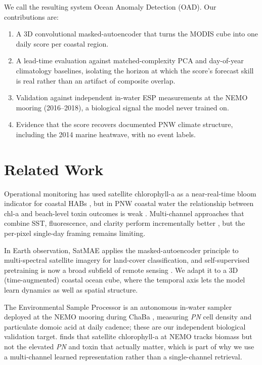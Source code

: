\documentclass[10pt,twocolumn,letterpaper]{article}
\begin{document}
We call the resulting system Ocean Anomaly Detection (OAD). Our contributions are:

\begin{enumerate}\itemsep1pt
    \item A 3D convolutional masked-autoencoder that turns the MODIS cube into one daily score per coastal region.
    \item A lead-time evaluation against matched-complexity PCA and day-of-year climatology baselines, isolating the horizon at which the score's forecast skill is real rather than an artifact of composite overlap.
    \item Validation against independent in-water ESP measurements at the NEMO mooring (2016--2018), a biological signal the model never trained on.
    \item Evidence that the score recovers documented PNW climate structure, including the 2014 marine heatwave, with no event labels.
\end{enumerate}

\section{Related Work}
\label{sec:related}

Operational monitoring has used satellite chlorophyll-a as a near-real-time bloom indicator for coastal HABs \cite{McKibben2015}, but in PNW coastal water the relationship between chl-a and beach-level toxin outcomes is weak \cite{Trainer2000,Trainer2009}. Multi-channel approaches that combine SST, fluorescence, and clarity perform incrementally better \cite{Anderson2016}, but the per-pixel single-day framing remains limiting.

In Earth observation, SatMAE \cite{Cong2022SatMAE} applies the masked-autoencoder principle \cite{He2022MAE} to multi-spectral satellite imagery for land-cover classification, and self-supervised pretraining is now a broad subfield of remote sensing \cite{Wang2023MAE}. We adapt it to a 3D (time-augmented) coastal ocean cube, where the temporal axis lets the model learn dynamics as well as spatial structure.

The Environmental Sample Processor \cite{Scholin2017} is an autonomous in-water sampler deployed at the NEMO mooring during ChaBa \cite{Moore2021ESP}, measuring \textit{PN} cell density and particulate domoic acid at daily cadence; these are our independent biological validation target. \cite{Moore2021ESP} finds that satellite chlorophyll-a at NEMO tracks biomass but not the elevated \textit{PN} and toxin that actually matter, which is part of why we use a multi-channel learned representation rather than a single-channel retrieval.
\end{document}

